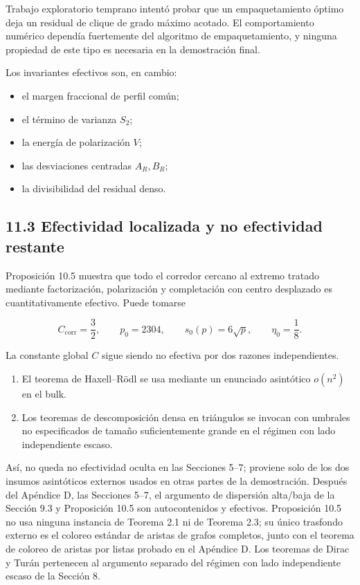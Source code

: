 \documentclass[spanish,11pt,a4paper]{article}
\providecommand{\tightlist}{\setlength{\itemsep}{0pt}\setlength{\parskip}{0pt}}
\begin{document}
Trabajo exploratorio temprano intentó probar que un empaquetamiento
óptimo deja un residual de clique de grado máximo acotado. El
comportamiento numérico dependía fuertemente del algoritmo de
empaquetamiento, y ninguna propiedad de este tipo es necesaria en la
demostración final.

Los invariantes efectivos son, en cambio:

\begin{itemize}
\tightlist
\item
  el margen fraccional de perfil común;
\item
  el término de varianza \(S_2\);
\item
  la energía de polarización \(V\);
\item
  las desviaciones centradas \(A_R,B_R\);
\item
  la divisibilidad del residual denso.
\end{itemize}

\subsection{11.3 Efectividad localizada y no efectividad
restante}\label{efectividad-localizada-y-no-efectividad-restante}

Proposición 10.5 muestra que todo el corredor cercano al extremo tratado
mediante factorización, polarización y completación con centro
desplazado es cuantitativamente efectivo. Puede tomarse

\[
C_{\mathrm{corr}}=\frac32,
\qquad
p_0=2304,
\qquad
s_0(p)=6\sqrt p,
\qquad
\eta_0=\frac18.
\]

La constante global \(C\) sigue siendo no efectiva por dos razones
independientes.

\begin{enumerate}
\def\labelenumi{\arabic{enumi}.}
\tightlist
\item
  El teorema de Haxell--Rödl se usa mediante un enunciado asintótico
  \(o(n^2)\) en el bulk.
\item
  Los teoremas de descomposición densa en triángulos se invocan con
  umbrales no especificados de tamaño suficientemente grande en el
  régimen con lado independiente escaso.
\end{enumerate}

Así, no queda no efectividad oculta en las Secciones 5--7; proviene solo
de los dos insumos asintóticos externos usados en otras partes de la
demostración. Después del Apéndice D, las Secciones 5--7, el argumento
de dispersión alta/baja de la Sección 9.3 y Proposición 10.5 son
autocontenidos y efectivos. Proposición 10.5 no usa ninguna instancia de
Teorema 2.1 ni de Teorema 2.3; su único trasfondo externo es el coloreo
estándar de aristas de grafos completos, junto con el teorema de coloreo
de aristas por listas probado en el Apéndice D. Los teoremas de Dirac y
Turán pertenecen al argumento separado del régimen con lado
independiente escaso de la Sección 8.
\end{document}
